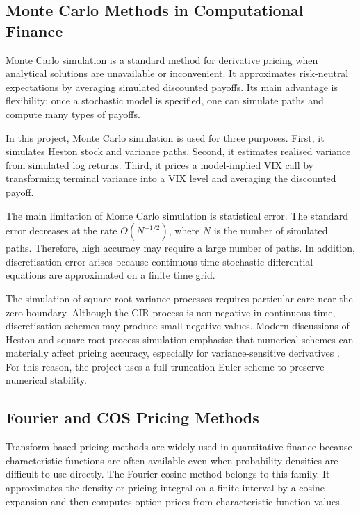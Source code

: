 \subsection{Monte Carlo Methods in Computational Finance}

Monte Carlo simulation is a standard method for derivative pricing when analytical solutions are unavailable or inconvenient. It approximates risk-neutral expectations by averaging simulated discounted payoffs. Its main advantage is flexibility: once a stochastic model is specified, one can simulate paths and compute many types of payoffs.

In this project, Monte Carlo simulation is used for three purposes. First, it simulates Heston stock and variance paths. Second, it estimates realised variance from simulated log returns. Third, it prices a model-implied VIX call by transforming terminal variance into a VIX level and averaging the discounted payoff.

The main limitation of Monte Carlo simulation is statistical error. The standard error decreases at the rate \(O(N^{-1/2})\), where \(N\) is the number of simulated paths. Therefore, high accuracy may require a large number of paths. In addition, discretisation error arises because continuous-time stochastic differential equations are approximated on a finite time grid.

The simulation of square-root variance processes requires particular care near the zero boundary. Although the CIR process is non-negative in continuous time, discretisation schemes may produce small negative values. Modern discussions of Heston and square-root process simulation emphasise that numerical schemes can materially affect pricing accuracy, especially for variance-sensitive derivatives \citep{choikwok2024heston,abijaber2024squareroot}. For this reason, the project uses a full-truncation Euler scheme to preserve numerical stability.

\subsection{Fourier and COS Pricing Methods}

Transform-based pricing methods are widely used in quantitative finance because characteristic functions are often available even when probability densities are difficult to use directly. The Fourier-cosine method belongs to this family. It approximates the density or pricing integral on a finite interval by a cosine expansion and then computes option prices from characteristic function values.

